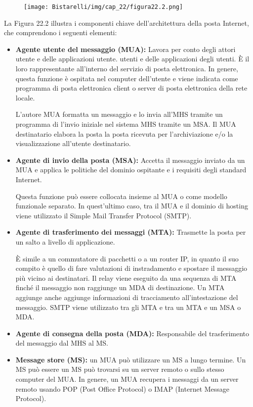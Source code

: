 \begin{figure}[H]
	\centering
    \texttt{[image: Bistarelli/img/cap\_22/figura22.2.png]}
\end{figure}

La Figura 22.2 illustra i componenti chiave dell'architettura della posta Internet, che comprendono i seguenti elementi:

\begin{itemize}
    \item \textbf{Agente utente del messaggio (MUA):} Lavora per conto degli attori utente e delle applicazioni utente. utenti e delle applicazioni degli utenti. È il loro rappresentante all'interno del servizio di posta elettronica. In genere, questa funzione è ospitata nel computer dell'utente e viene indicata come programma di posta elettronica client o server di posta elettronica della rete locale. 
    
    L'autore MUA formatta un messaggio e lo invia all'MHS tramite un programma di l'invio iniziale nel sistema MHS tramite un MSA. Il MUA destinatario elabora la posta la posta ricevuta per l'archiviazione e/o la visualizzazione all'utente destinatario.
    
    \item \textbf{Agente di invio della posta (MSA):} Accetta il messaggio inviato da un MUA e applica le politiche del dominio ospitante e i requisiti degli standard Internet.
    
    Questa funzione può essere collocata insieme al MUA o come modello funzionale separato. In quest'ultimo caso, tra il MUA e il dominio di hosting viene utilizzato il Simple Mail Transfer Protocol (SMTP).
    
    \item \textbf{Agente di trasferimento dei messaggi (MTA):} Trasmette la posta per un salto a livello di applicazione.
    
    È simile a un commutatore di pacchetti o a un router IP, in quanto il suo compito è quello di fare valutazioni di instradamento e spostare il messaggio più vicino ai destinatari. Il relay viene eseguito da una sequenza di MTA finché il messaggio non raggiunge un MDA di destinazione. Un MTA aggiunge anche aggiunge informazioni di tracciamento all'intestazione del messaggio. SMTP viene utilizzato tra gli MTA e tra un MTA e un MSA o MDA.
    
    \item \textbf{Agente di consegna della posta (MDA):} Responsabile del trasferimento del messaggio dal MHS al MS.
    
    \item \textbf{Message store (MS):} un MUA può utilizzare un MS a lungo termine. Un MS può essere un MS può trovarsi su un server remoto o sullo stesso computer del MUA. In genere, un MUA recupera i messaggi da un server remoto usando POP (Post Office Protocol) o IMAP (Internet Message Protocol).
\end{itemize}
